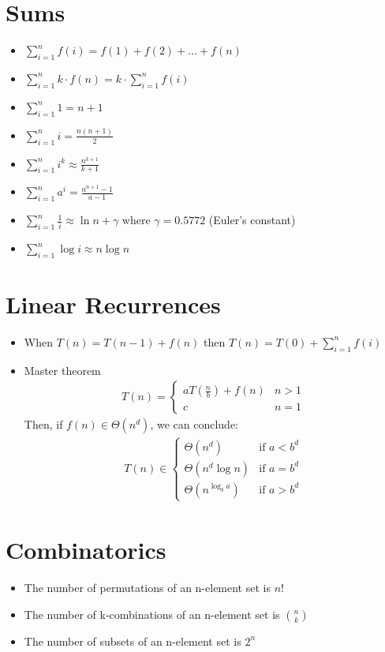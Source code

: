 \documentclass[11pt]{article}
\begin{document}
\section{Sums}
\label{sec:org008571d}

\begin{itemize}
\item \(\sum_{i=1}^{n} f(i) = f(1) + f(2) + \ldots + f(n)\)
\item \(\sum_{i=1}^{n} k \cdot f(n) = k \cdot \sum_{i=1}^{n} f(i)\)
\item \(\sum_{i=1}^{n} 1 = n+1\)
\item \(\sum_{i=1}^{n} i = \frac{n(n+1)}{2}\)
\item \(\sum_{i=1}^{n} i^k \approx \frac{n^{k+1}}{k+1}\)
\item \(\sum_{i=1}^{n} a^i = \frac{a^{n+1}-1}{a-1}\)
\item \(\sum_{i=1}^{n} \frac{1}{i} \approx \ln n + \gamma\) where \(\gamma = 0.5772\) (Euler's constant)
\item \(\sum_{i=1}^{n} \log i \approx n \log n\)
\end{itemize}


\section{Linear Recurrences}
\label{sec:orgdc7500e}

\begin{itemize}
\item When \(T(n) = T(n-1) + f(n)\)
then \(T(n) =  T(0) + \sum_{i=1}^{n} f(i)\)

\item Master theorem
\begin{align*}
   T(n) = \begin{cases}
      a T(\frac{n}{b}) + f(n) & n > 1 \\
      c & n=1
   \end{cases}
\end{align*}
Then, if \(f(n) \in \Theta(n^d)\), we can conclude:
\begin{align*}
T(n) \in \begin{cases}
   \Theta(n^d) & \text{if } a < b^d  \\
   \Theta(n^d \log n) & \text{if } a = b^d \\
   \Theta(n^{\log_b a}) & \text{if } a > b^d
\end{cases}
\end{align*}
\end{itemize}

\section{Combinatorics}
\label{sec:org127bd53}

\begin{itemize}
\item The number of permutations of an n-element set is \(n!\)
\item The number of k-combinations of an n-element set is \(\binom{n}{k}\)
\item The number of subsets of an n-element set is \(2^n\)
\end{itemize}
\end{document}
